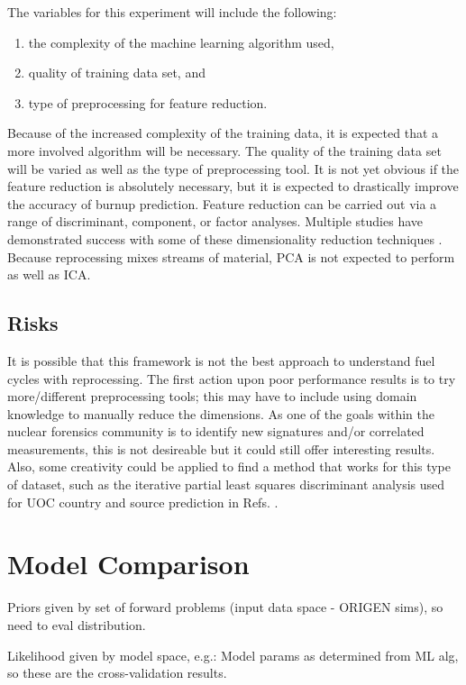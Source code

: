 The variables for this experiment will include the following:
\begin{enumerate}
  \itemsep-0.75em
  \item the complexity of the machine learning algorithm used,
  \item quality of training data set, and 
  \item type of preprocessing for feature reduction.
\end{enumerate}

Because of the increased complexity of the training data, it is expected that a
more involved algorithm will be necessary.  The quality of the training data
set will be varied as well as the type of preprocessing tool.  It is not yet
obvious if the feature reduction is absolutely necessary, but it is expected to
drastically improve the accuracy of burnup prediction.  Feature reduction can
be carried out via a range of discriminant, component, or factor analyses.
Multiple studies have demonstrated success with some of these dimensionality
reduction techniques \cite{nicolaou_2006, nicolaou_2009, nicolaou_2014,
nicolaou_2015, robel_2009, pu_discrimination, jones_viz_2014, jones_snf_2014}.
Because reprocessing mixes streams of material, \gls{PCA} is not expected to
perform as well as \gls{ICA}.

\subsection*{Risks}

It is possible that this framework is not the best approach to understand fuel
cycles with reprocessing. The first action upon poor performance results is to
try more/different preprocessing tools; this may have to include using domain
knowledge to manually reduce the dimensions. As one of the goals within the
nuclear forensics community is to identify new signatures and/or correlated
measurements, this is not desireable but it could still offer interesting
results. Also, some creativity could be applied to find a method that works for
this type of dataset, such as the iterative partial least squares discriminant
analysis used for \gls{UOC} country and source prediction in Refs.
\cite{robel_2009, pu_discrimination}.

\section{Model Comparison}
\label{sec:modelcompare}

Priors given by set of forward problems (input data space - ORIGEN sims), so
need to eval distribution.

Likelihood given by model space, e.g.: Model params as determined from ML alg,
so these are the cross-validation results.

